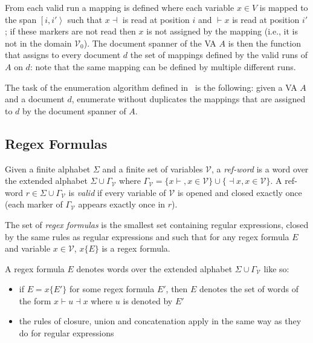 \documentclass[12px]{article}
\newcommand{\Span}[1]{\left[ #1 \right\rangle}
\begin{document}
        From each valid run a mapping is defined where each variable $x \in V$
        is mapped to the span $\Span{i, i'}$ such that $x \dashv$ is read at
        position $i$ and $\vdash x$ is read at position $i'$; if these markers
        are not read then $x$ is not assigned by the mapping (i.e., it is not
        in the domain $\mathcal{V}_0$). The document spanner of the VA $A$ is
        then the function that assigns to every document $d$ the set of
        mappings defined by the valid runs of $A$ on $d$: note that the same
        mapping can be defined by multiple different runs.

        The task of the enumeration algorithm defined in~\cite{ICDT19} is the
        following: given a VA $A$ and a document $d$, enumerate without
        duplicates the mappings that are assigned to $d$ by the document
        spanner of $A$.

    \subsection{Regex Formulas}

      Given a finite alphabet $\Sigma$ and a finite set of variables
      $\mathcal{V}$, a \textit{ref-word} is a word over the extended alphabet
      $\Sigma \cup \Gamma_\mathcal{V}$ where $\Gamma_\mathcal{V} = \{x{\vdash},
      x \in \mathcal{V}\} \cup \{{\dashv}x, x \in \mathcal{V}\}$. A ref-word $r
      \in \Sigma \cup \Gamma_\mathcal{V}$ is \textit{valid} if every variable
      of $\mathcal{V}$ is opened and closed exactly once (each marker of
      $\Gamma_\mathcal{V}$ appears exactly once in $r$).


      The set of \textit{regex formulas} is the smallest set containing regular
      expressions, closed by the same rules as regular expressions and such
      that for any regex formula $E$ and variable $x \in \mathcal{V}$, $x\{E\}$
      is a regex formula.

      A regex formula $E$ denotes words over the extended alphabet $\Sigma
      \cup \Gamma_\mathcal{V}$ like so:
        \begin{itemize}
          \item if $E = x\{E'\}$ for some regex formula $E'$, then $E$ denotes
            the set of words of the form $x{\vdash} u {\dashv}x$ where $u$ is
            denoted by $E'$
          \item the rules of closure, union and concatenation apply in the same
            way as they do for regular expressions
        \end{itemize}
\end{document}
